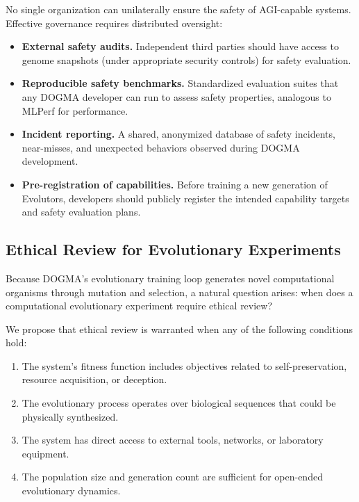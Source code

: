 No single organization can unilaterally ensure the safety of AGI-capable systems.
Effective governance requires distributed oversight:

\begin{itemize}[leftmargin=1.5em]
  \item \textbf{External safety audits.} Independent third parties should have access to genome snapshots (under appropriate security controls) for safety evaluation.
  \item \textbf{Reproducible safety benchmarks.} Standardized evaluation suites that any DOGMA developer can run to assess safety properties, analogous to MLPerf for performance.
  \item \textbf{Incident reporting.} A shared, anonymized database of safety incidents, near-misses, and unexpected behaviors observed during DOGMA development.
  \item \textbf{Pre-registration of capabilities.} Before training a new generation of Evolutors, developers should publicly register the intended capability targets and safety evaluation plans.
\end{itemize}

\subsection{Ethical Review for Evolutionary Experiments}

Because DOGMA's evolutionary training loop generates novel computational organisms through mutation and selection, a natural question arises: when does a computational evolutionary experiment require ethical review?

We propose that ethical review is warranted when any of the following conditions hold:
\begin{enumerate}[leftmargin=1.8em]
  \item The system's fitness function includes objectives related to self-preservation, resource acquisition, or deception.
  \item The evolutionary process operates over biological sequences that could be physically synthesized.
  \item The system has direct access to external tools, networks, or laboratory equipment.
  \item The population size and generation count are sufficient for open-ended evolutionary dynamics.
\end{enumerate}

